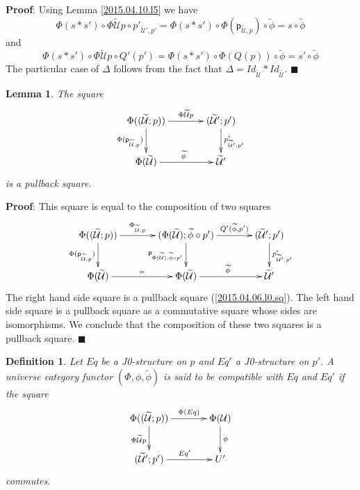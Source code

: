 \documentclass[12pt]{article}
\numberwithin{equation}{section}
\newenvironment{eq}{\begin{equation}}{\end{equation}}
\newenvironment{myproof}{{\bf Proof}:}{$\blacksquare$ \vskip 5mm }
\newtheorem{lemma}[proposition]{Lemma}
\newtheorem{definition}[proposition]{Definition}
\newcommand{\llabel}[1]{\label{#1}}
\newcommand{\wt}{\widetilde}
\newcommand{\p}{\mathsf{p}}
\newcommand{\U}{\mathcal{U}}
\begin{document}
%
\begin{myproof}
Using Lemma \ref{2015.04.10.l5} we have
%
$$\Phi(s*s')\circ \Phi\wt{\U}p\circ
p'_{\wt{\U}',p'}=\Phi(s*s')\circ\Phi(\p_{\wt{\U},p})\circ\wt{\phi}=s\circ
\wt{\phi}$$
%
and
%
$$\Phi(s*s')\circ \Phi\wt{\U}p\circ Q'(p')=\Phi(s*s')\circ \Phi(Q(p))\circ
\wt{\phi}=s'\circ\wt{\phi}$$
%
The particular case of $\Delta$ follows from the fact that
$\Delta=Id_{\wt{\U}}*Id_{\wt{\U}}$.
\end{myproof}
%
\begin{lemma}
\llabel{2015.04.06.l5} The square
%
\begin{eq}\llabel{2015.04.06.eq10-bis}
\begin{xy}
          \xymatrix@C=3pc{ \Phi((\wt{\U};p)) \ar[r]^-{\Phi\wt{\U}p} \ar[d]_{
              \Phi(\p_{\wt{\U},p})} & (\wt{\U}';p')
            \ar[d]^{p'_{\wt{\U}',p'}}\\ \Phi(\wt{\U}) \ar[r]^{\wt{\phi}} &
            \wt{\U}' }
\end{xy}
\end{eq}
%
is a pullback square.
\end{lemma}
%
\begin{myproof}
This square is equal to the composition of two squares
%
$$
\begin{xy}
          \xymatrix@C=3pc{ \Phi((\wt{\U};p)) \ar[r]^-{\Phi_{\wt{\U},p}}\ar[d]_{
              \Phi(\p_{\wt{\U},p})} & (\Phi(\wt{\U});\wt{\phi}\circ p')
            \ar[r]^-{Q'(\wt{\phi},p')}\ar[d]_{\p_{\Phi(\wt{\U}),\wt{\phi}\circ
                p'}} & (\wt{\U}';p') \ar[d]^{p'_{\wt{\U}',p'}}\\ \Phi(\wt{\U})
            \ar[r]^{=} & \Phi(\wt{\U}) \ar[r]^{\wt{\phi}} & \wt{\U}' }
\end{xy}
$$
%
The right hand side square is a pullback square (\ref{2015.04.06.l0.sq}). The
left hand side square is a pullback square as a commutative square whose sides
are isomorphisms. We conclude that the composition of these two squares is a
pullback square.
\end{myproof}
%
\begin{definition}
\llabel{2015.04.06.def4} Let $Eq$ be a J0-structure on $p$ and $Eq'$ a
J0-structure on $p'$. A universe category functor $(\Phi,\phi,\wt{\phi})$ is
said to be compatible with $Eq$ and $Eq'$ if the square
%
\begin{eq}\llabel{2015.04.06.eq6}
\begin{xy}
          \xymatrix@C=3pc{ \Phi((\wt{\U};p)) \ar[r]^-{\Phi(Eq)}
            \ar[d]_{\Phi\wt{\U}p} & \Phi(\U) \ar[d]^{\phi}\\ (\wt{\U}';p')
            \ar[r]^{Eq'} & U' }
\end{xy}
\end{eq}
%
commutes.
\end{definition}
\end{document}
